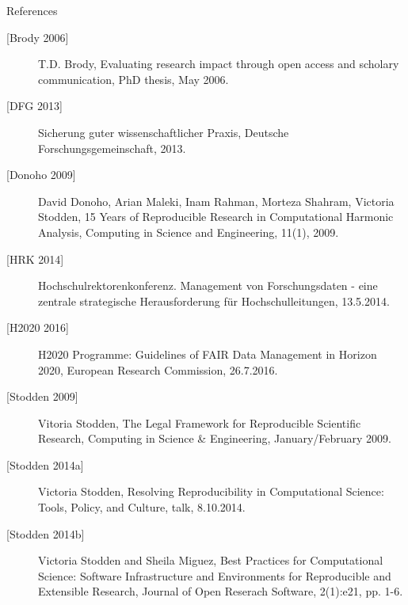 \documentclass{intbeamer}
\begin{document}
\begin{frame}{References}

{\scriptsize
\begin{description}
\item[{[Brody 2006]}] T.D. Brody, Evaluating research impact through open access and scholary communication, PhD thesis, May 2006.
\item[{[DFG 2013]}] Sicherung guter wissenschaftlicher Praxis, Deutsche Forschungsgemeinschaft, 2013.
\item[{[Donoho 2009]}] David Donoho, Arian Maleki, Inam Rahman, Morteza Shahram, Victoria Stodden, 15 Years of Reproducible Research in Computational Harmonic Analysis, Computing in Science and Engineering, 11(1), 2009.
\item[{[HRK 2014]}] Hochschulrektorenkonferenz. Management von Forschungsdaten - eine zentrale strategische Herausforderung für Hochschulleitungen, 13.5.2014.
\item[{[H2020 2016]}] H2020 Programme: Guidelines of FAIR Data Management in Horizon 2020, European Research Commission, 26.7.2016.
\item[{[Stodden 2009]}] Vitoria Stodden, The Legal Framework for Reproducible Scientific Research, Computing in Science \& Engineering, January/February 2009.
\item[{[Stodden 2014a]}] Victoria Stodden, Resolving Reproducibility in Computational Science: Tools, Policy, and Culture, talk, 8.10.2014.
\item[{[Stodden 2014b]}] Victoria Stodden and Sheila Miguez, Best Practices for Computational Science: Software Infrastructure and Environments for Reproducible and Extensible Research, Journal of Open Reserach Software, 2(1):e21, pp. 1-6.


\end{description}
}

\end{frame}
\end{document}
